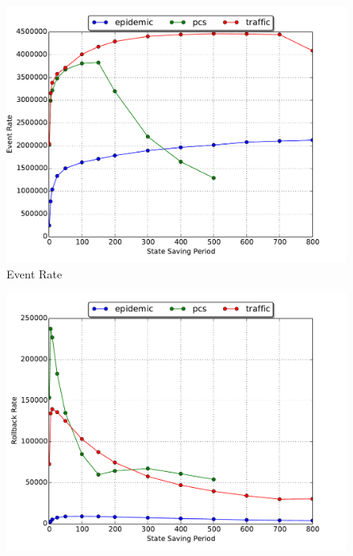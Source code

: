 \documentclass[11pt]{book}
\begin{document}
\begin{figure}
  \begin{minipage}{.5\textwidth}
    \begin{center}
      \includegraphics[width=\textwidth,keepaspectratio,quiet]{figs/state_saving/beowulf/eventrate.pdf} \\
      Event Rate \\
    \end{center}
  \end{minipage}%
  \hfill
  \begin{minipage}{.5\textwidth}
    \begin{center}
      \includegraphics[width=\textwidth,keepaspectratio,quiet]{figs/state_saving/beowulf/rb_rate.pdf} \\

\end{center}
\end{minipage}
\end{figure}
\end{document}
